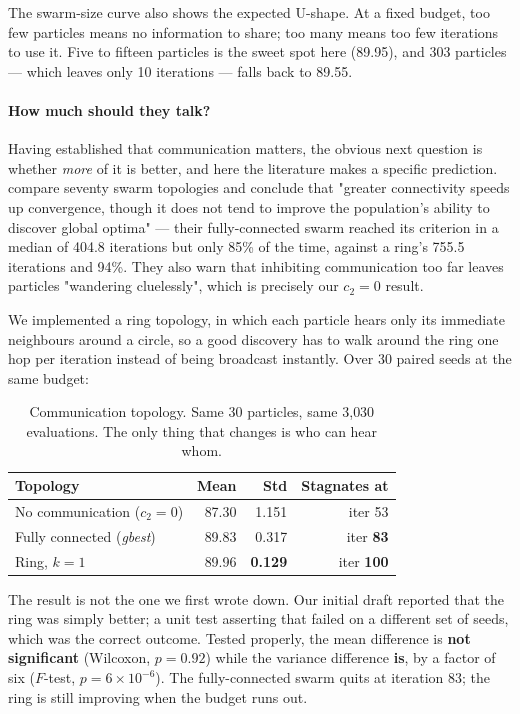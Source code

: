 \documentclass{ai-lab-report}
\begin{document}
The swarm-size curve also shows the expected U-shape. At a fixed budget, too few particles
means no information to share; too many means too few iterations to use it. Five to fifteen
particles is the sweet spot here (89.95), and 303 particles --- which leaves only 10 iterations
--- falls back to 89.55.

\paragraph{How much should they talk?}
Having established that communication matters, the obvious next question is whether \emph{more}
of it is better, and here the literature makes a specific prediction.
\citet{kennedy2002population} compare seventy swarm topologies and conclude that "greater
connectivity speeds up convergence, though it does not tend to improve the population's ability
to discover global optima" --- their fully-connected swarm reached its criterion in a median of
404.8 iterations but only 85\% of the time, against a ring's 755.5 iterations and 94\%. They
also warn that inhibiting communication too far leaves particles "wandering cluelessly", which
is precisely our $c_2 = 0$ result.

We implemented a ring topology, in which each particle hears only its immediate neighbours
around a circle, so a good discovery has to walk around the ring one hop per iteration instead
of being broadcast instantly. Over 30 paired seeds at the same budget:

\begin{table}[H]
\centering
\caption{Communication topology. Same 30 particles, same 3{,}030 evaluations. The only thing
that changes is who can hear whom.}
\label{tab:a3topo}
\begin{tabular}{lrrr}
\toprule
Topology & Mean & Std & Stagnates at \\
\midrule
No communication ($c_2 = 0$) & 87.30 & 1.151 & iter 53 \\
Fully connected (\emph{gbest}) & 89.83 & 0.317 & iter \textbf{83} \\
Ring, $k = 1$ & 89.96 & \textbf{0.129} & iter \textbf{100} \\
\bottomrule
\end{tabular}
\end{table}

The result is not the one we first wrote down. Our initial draft reported that the ring was
simply better; a unit test asserting that failed on a different set of seeds, which was the
correct outcome. Tested properly, the mean difference is \textbf{not significant} (Wilcoxon,
$p = 0.92$) while the variance difference \textbf{is}, by a factor of six ($F$-test,
$p = 6 \times 10^{-6}$). The fully-connected swarm quits at iteration 83; the ring is still
improving when the budget runs out.
\end{document}
